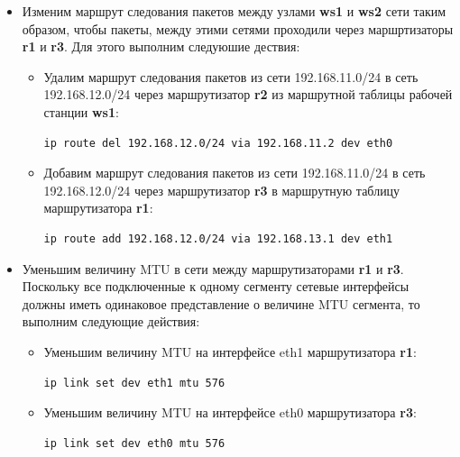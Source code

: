 \documentclass[a4paper,12pt]{article}
\begin{document}
\begin{itemize}

\item Изменим маршрут следования пакетов между узлами \textbf{ws1} и \textbf{ws2} сети 
       таким образом, чтобы пакеты, между этими сетями проходили через маршртизаторы \textbf{r1}
       и \textbf{r3}. Для этого выполним следуюшие дествия:

\begin{itemize}

\item Удалим маршрут следования пакетов из сети 192.168.11.0/24 в сеть
       192.168.12.0/24 через маршрутизатор \textbf{r2} из маршрутной таблицы
       рабочей станции \textbf{ws1}:

\begin{Verbatim}
ip route del 192.168.12.0/24 via 192.168.11.2 dev eth0
\end{Verbatim}

\item Добавим маршрут следования пакетов из сети 192.168.11.0/24 в сеть
       192.168.12.0/24 через маршрутизатор \textbf{r3} в маршрутную таблицу
       маршрутизатора \textbf{r1}:

\begin{Verbatim}
ip route add 192.168.12.0/24 via 192.168.13.1 dev eth1
\end{Verbatim}

\end{itemize}

\item Уменьшим величину MTU в сети между маршрутизаторами \textbf{r1} и \textbf{r3}. 
       Поскольку все подключенные к одному сегменту сетевые интерфейсы должны иметь 
       одинаковое представление о величине MTU сегмента, то выполним следующие действия:
       
\begin{itemize}

\item Уменьшим величину MTU на интерфейсе eth1 маршрутизатора \textbf{r1}:

\begin{Verbatim}
ip link set dev eth1 mtu 576
\end{Verbatim}

\item Уменьшим величину MTU на интерфейсе eth0 маршрутизатора \textbf{r3}:

\begin{Verbatim}
ip link set dev eth0 mtu 576
\end{Verbatim}


\end{itemize}
\end{itemize}
\end{document}
